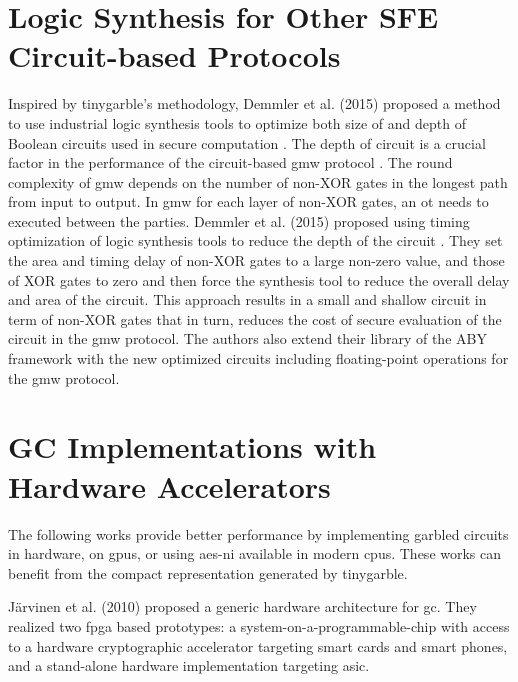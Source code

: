 \section{Logic Synthesis for Other SFE Circuit-based Protocols} \label{sec:related-logic}
Inspired by \gls{tinygarble}'s methodology, Demmler et al. (2015) proposed a method to use industrial logic synthesis tools to optimize both size of and depth of Boolean circuits used in secure computation \cite{demmler2015automated}.
The depth of circuit is a crucial factor in the performance of the circuit-based \acrfull{gmw} protocol \cite{goldreich1987play}.
The round complexity of \acrshort{gmw} depends on the number of non-XOR gates in the longest path from input to output.
In \acrshort{gmw} for each layer of non-XOR gates, an \acrshort{ot} needs to executed between the parties.
Demmler et al. (2015) proposed using timing optimization of logic synthesis tools to reduce the depth of the circuit \cite{demmler2015automated}.
They set the area and timing delay of non-XOR gates to a large non-zero value, and those of XOR gates to zero and then force the synthesis tool to reduce the overall delay and area of the circuit.
This approach results in a small and shallow circuit in term of non-XOR gates that in turn, reduces the cost of secure evaluation of the circuit in the \acrshort{gmw} protocol.
The authors also extend their library of the ABY framework \cite{demmler2015aby} with the new optimized circuits including floating-point operations for the \acrshort{gmw} protocol.

\section{GC Implementations with Hardware Accelerators} \label{sec:related-hardware}
The following works provide better performance by implementing garbled circuits in hardware, on \acrfull{gpu}s, or using \acrfull{aes-ni} available in modern \acrshort{cpu}s.
These works can benefit from the compact representation generated by \gls{tinygarble}.

J\"arvinen et al. (2010) \cite{jarvinen2010garbled} proposed a generic hardware architecture for \acrshort{gc}.
They realized two \acrfull{fpga} based prototypes: a system-on-a-programmable-chip with access to a hardware cryptographic accelerator targeting smart cards and smart phones, and a stand-alone hardware implementation targeting \acrfull{asic}.

